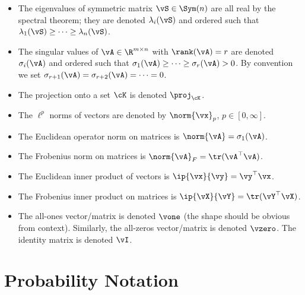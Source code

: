\begin{itemize}
        are \(\PSD(n)\), symmetric PD matrices are \(\PD(n)\).
    \item The eigenvalues of symmetric matrix \(\vS \in \Sym(n)\) are
        all real by the spectral theorem; they are denoted
        \(\lambda_{i}(\vS)\) and ordered such that \(\lambda_{1}(\vS)
        \geq \cdots \geq \lambda_{n}(\vS)\).
    \item The singular values of \(\vA \in \R^{m \times n}\) with
        \(\rank(\vA) = r\) are denoted  \(\sigma_{i}(\vA)\) and
        ordered such that \(\sigma_{1}(\vA) \geq \cdots \geq
        \sigma_{r}(\vA) > 0\). By convention we set \(\sigma_{r +
        1}(\vA) = \sigma_{r + 2}(\vA) = \cdots = 0\).
    \item The projection onto a set \(\cK\) is denoted \(\proj_{\cK}\).
    \item The \(\ell^{p}\) norms of vectors are denoted by
        \(\norm{\vx}_{p}\), \(p \in [0, \infty]\).
    \item The Euclidean operator norm on matrices is \(\norm{\vA} =
        \sigma_{1}(\vA)\).
    \item The Frobenius norm on matrices is \(\norm{\vA}_{F} =
        \tr(\vA^{\top}\vA)\).
    \item The Euclidean inner product of vectors is \(\ip{\vx}{\vy} =
        \vy^{\top} \vx\).
    \item The Frobenius inner product on matrices is \(\ip{\vX}{\vY}
        = \tr(\vY^{\top}\vX)\).
    \item The all-ones vector/matrix is denoted \(\vone\) (the shape
        should be obvious from context). Similarly, the all-zeros
        vector/matrix is denoted \(\vzero\). The identity matrix is
        denoted \(\vI\).
\end{itemize}

\section*{Probability Notation}

